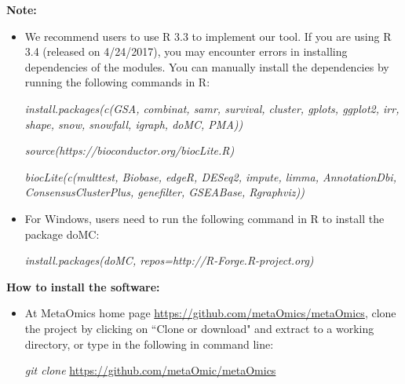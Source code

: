 \noindent\textbf{Note:}

\begin{itemize}
\item We recommend users to use R 3.3 to implement our tool. If you are using R 3.4 (released on 4/24/2017), you may encounter errors in installing dependencies of the modules. You can manually install the dependencies by running the following commands in R:

\textit{install.packages(c(\textquotesingle GSA\textquotesingle, \textquotesingle combinat\textquotesingle, \textquotesingle   samr\textquotesingle   , \textquotesingle   survival\textquotesingle   , \textquotesingle   cluster\textquotesingle   , \textquotesingle   gplots\textquotesingle   , 
  \textquotesingle   ggplot2\textquotesingle   , \textquotesingle   irr\textquotesingle   , \textquotesingle   shape\textquotesingle   , \textquotesingle   snow\textquotesingle   , \textquotesingle   snowfall\textquotesingle   , \textquotesingle   igraph\textquotesingle   , \textquotesingle   doMC\textquotesingle   , \textquotesingle   PMA\textquotesingle   ))
  }

\textit{source(\textquotesingle   https://bioconductor.org/biocLite.R\textquotesingle   )  }

\textit{biocLite(c(\textquotesingle   multtest\textquotesingle   , \textquotesingle   Biobase\textquotesingle   , \textquotesingle   edgeR\textquotesingle   , \textquotesingle   DESeq2\textquotesingle   , \textquotesingle   impute\textquotesingle   , 
  \textquotesingle   limma\textquotesingle   , \textquotesingle   AnnotationDbi\textquotesingle   , \textquotesingle   ConsensusClusterPlus\textquotesingle   , \textquotesingle   genefilter\textquotesingle   , \textquotesingle   GSEABase\textquotesingle   , \textquotesingle   Rgraphviz\textquotesingle   ))
  }

\item For Windows, users need to run the following command in R to install the package \textquotesingle doMC\textquotesingle:

\textit{install.packages(\textquotesingle doMC\textquotesingle, repos=\textquotesingle http://R-Forge.R-project.org\textquotesingle)}

\end{itemize}

 

\noindent\textbf{How to install the software:}
\begin{itemize}
\item At MetaOmics home page \url{https://github.com/metaOmics/metaOmics}, clone the project by
clicking on ``Clone or download" and extract to a working directory, 
or type in the following in command line:

\textit{git clone} \url{https://github.com/metaOmic/metaOmics}
\end{itemize}

